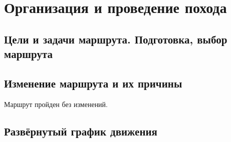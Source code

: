 \section{Организация и проведение похода}
\subsection{Цели и задачи маршрута. Подготовка, выбор маршрута}
\subsection{Изменение маршрута и их причины}
Маршрут пройден без изменений.
\subsection{Развёрнутый график движения}
\newpage